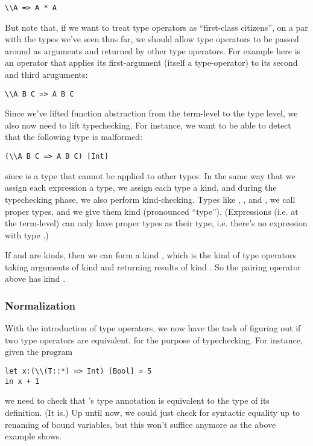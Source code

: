 \documentclass[pageno]{jpaper}
\begin{document}
{{{\begin{lstlisting}
\\A => A * A
\end{lstlisting}

But note that, if we want to treat type operators as ``first-class citizens'', on a par with the types
we've seen thus far, we should allow type operators to be passed around as arguments and returned by other
type operators. For example here is an operator that applies its first-argument (itself a type-operator)
to its second and third aruguments:

\begin{lstlisting}
\\A B C => A B C
\end{lstlisting}

Since we've lifted function abstraction from the term-level to the type level, we also now need to lift
typechecking. For instance, we want to be able to detect that the following type is malformed:

\begin{lstlisting}
(\\A B C => A B C) [Int]
\end{lstlisting}
since  is a type that cannot be applied to other types.
In the same way that we assign each expression a type, we assign each type a kind, and during the
typechecking phase, we also perform kind-checking. Types like , , and
, we call proper types, and we give them kind \lsti{*} (pronounced ``type'').
(Expressions (i.e. at the term-level) can only have proper types as their type, i.e. there's no
expression with type .)

If  and   are kinds, then we can form a kind , which is the kind of
type operators taking arguments of kind  and returning results of kind . So the pairing operator above has kind \lsti{* -> *}.

\subsubsection{Normalization}

With the introduction of type operators, we now have the task of figuring out if two type operators are
equivalent, for the purpose of typechecking. For instance, given the program
\begin{lstlisting}
let x:(\\(T::*) => Int) [Bool] = 5
in x + 1
\end{lstlisting}
we need to check that 's type annotation is equivalent to the type of its definition. (It is.)
Up until now, we could just check for syntactic equality up to renaming of bound variables, but this won't
suffice anymore as the above example shows.

}}}
\end{document}
